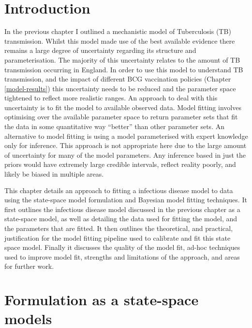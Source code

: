\documentclass[11pt,twoside]{bristolthesis}
\begin{document}
  \hypertarget{introduction-7}{%
  \section{Introduction}\label{introduction-7}}
  
  In the previous chapter I outlined a mechanistic model of Tuberculosis (TB) transmission. Whilst this model made use of the best available evidence there remains a large degree of uncertainty regarding its structure and parameterisation. The majority of this uncertainty relates to the amount of TB transmission occurring in England. In order to use this model to understand TB transmission, and the impact of different BCG vaccination policies (Chapter \ref{model-results}) this uncertainty needs to be reduced and the parameter space tightened to reflect more realistic ranges. An approach to deal with this uncertainty is to fit the model to available observed data. Model fitting involves optimising over the available parameter space to return parameter sets that fit the data in some quantitative way ``better'' than other parameter sets. An alternative to model fitting is using a model parameterised with expert knowledge only for inference. This approach is not appropriate here due to the large amount of uncertainty for many of the model parameters. Any inference based in just the priors would have extremely large credible intervals, reflect reality poorly, and likely be biased in multiple areas.
  
  This chapter details an approach to fitting a infectious disease model to data using the state-space model formulation and Bayesian model fitting techniques. It first outlines the infectious disease model discussed in the previous chapter as a state-space model, as well as detailing the data used for fitting the model, and the parameters that are fitted. It then outlines the theoretical, and practical, justification for the model fitting pipeline used to calibrate and fit this state space model. Finally it discusses the quality of the model fit, ad-hoc techniques used to improve model fit, strengths and limitations of the approach, and areas for further work.
  
  \hypertarget{formulation-as-a-state-space-models}{%
  \section{Formulation as a state-space models}\label{formulation-as-a-state-space-models}}
  
\end{document}
